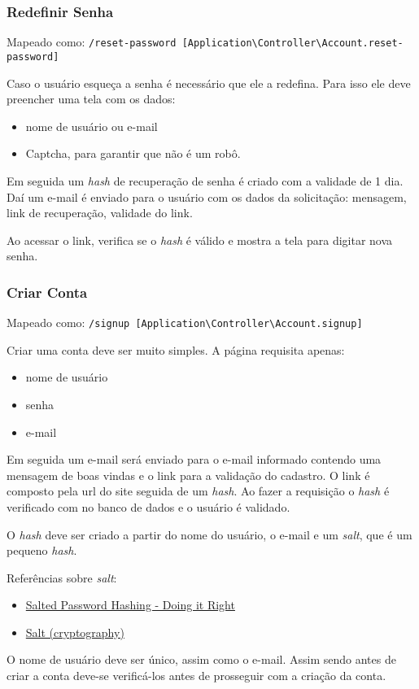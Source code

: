 \subsubsection{Redefinir Senha \label{reset-pass}}

Mapeado como:
\texttt{/reset-password {[}Application\textbackslash{}Controller\textbackslash{}Account.reset-password{]}}

Caso o usuário esqueça a senha é necessário que ele a redefina. Para
isso ele deve preencher uma tela com os dados:

\begin{itemize}
\item
  nome de usuário ou e-mail
\item
  Captcha, para garantir que não é um robô.
\end{itemize}
Em seguida um \emph{hash} de recuperação de senha é criado com a
validade de 1 dia. Daí um e-mail é enviado para o usuário com os dados
da solicitação: mensagem, link de recuperação, validade do link.

Ao acessar o link, verifica se o \emph{hash} é válido e mostra a tela
para digitar nova senha.

\subsubsection{Criar Conta \label{signup}}

Mapeado como:
\texttt{/signup {[}Application\textbackslash{}Controller\textbackslash{}Account.signup{]}}

Criar uma conta deve ser muito simples. A página requisita apenas:

\begin{itemize}
\item
  nome de usuário
\item
  senha
\item
  e-mail
\end{itemize}
Em seguida um e-mail será enviado para o e-mail informado contendo uma
mensagem de boas vindas e o link para a validação do cadastro. O link é
composto pela url do site seguida de um \emph{hash}. Ao fazer a
requisição o \emph{hash} é verificado com no banco de dados e o usuário
é validado.

O \emph{hash} deve ser criado a partir do nome do usuário, o e-mail e um
\emph{salt}, que é um pequeno \emph{hash}.

Referências sobre \emph{salt}:

\begin{itemize}
\item
  \href{https://crackstation.net/hashing-security.htm\#salt}{Salted
  Password Hashing - Doing it Right}
\item
  \href{http://en.wikipedia.org/wiki/Salt\_(cryptography)}{Salt
  (cryptography)}
\end{itemize}
O nome de usuário deve ser único, assim como o e-mail. Assim sendo antes
de criar a conta deve-se verificá-los antes de prosseguir com a criação
da conta.

